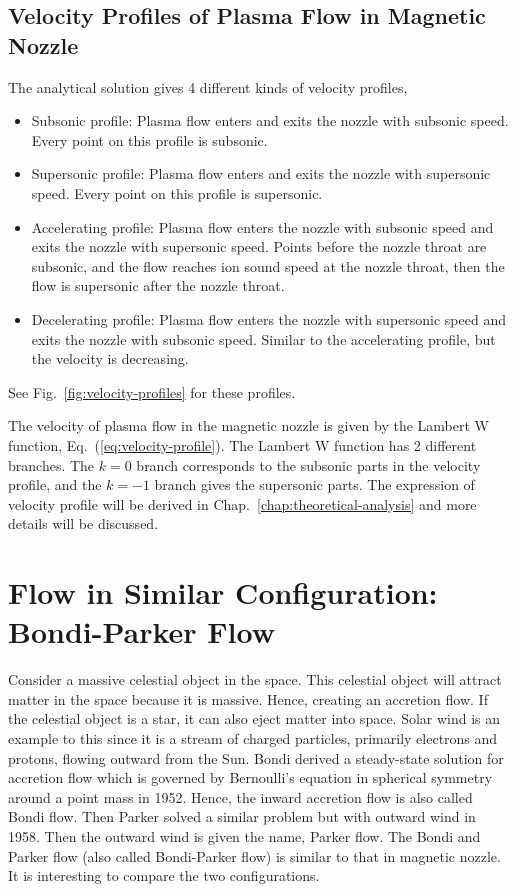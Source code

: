 \subsection{Velocity Profiles of Plasma Flow in Magnetic Nozzle}
The analytical solution gives 4 different kinds of velocity profiles,
\begin{itemize}
	\item Subsonic profile: Plasma flow enters and exits the nozzle with subsonic speed. Every point on this profile is subsonic.
	\item Supersonic profile: Plasma flow enters and exits the nozzle with supersonic speed. Every point on this profile is supersonic.
	\item Accelerating profile: Plasma flow enters the nozzle with subsonic speed and exits the nozzle with supersonic speed. Points before the nozzle throat are subsonic, and the flow reaches ion sound speed at the nozzle throat, then the flow is supersonic after the nozzle throat.
	\item Decelerating profile: Plasma flow enters the nozzle with supersonic speed and exits the nozzle with subsonic speed. Similar to the accelerating profile, but the velocity is decreasing.
\end{itemize}
See Fig.~\ref{fig:velocity-profiles} for these profiles.

The velocity of plasma flow in the magnetic nozzle is given by the Lambert W function, Eq.~(\ref{eq:velocity-profile}). The Lambert W function has 2 different branches. The $k=0$ branch corresponds to the subsonic parts in the velocity profile, and the $k=-1$ branch gives the supersonic parts. The expression of velocity profile will be derived in Chap.~\ref{chap:theoretical-analysis} and more details will be discussed.

\section{Flow in Similar Configuration: Bondi-Parker Flow}
Consider a massive celestial object in the space. This celestial object will attract matter in the space because it is massive. Hence, creating an accretion flow. If the celestial object is a star, it can also eject matter into space. Solar wind is an example to this since it is a stream of charged particles, primarily electrons and protons, flowing outward from the Sun. Bondi derived a steady-state solution for accretion flow which is governed by Bernoulli's equation in spherical symmetry around a point mass in 1952. Hence, the inward accretion flow is also called Bondi flow. Then Parker solved a similar problem but with outward wind in 1958. Then the outward wind is given the name, Parker flow. \cite{aikawa_stability_1979,bondi_spherically_1952,keto_stability_2020} The Bondi and Parker flow (also called Bondi-Parker flow) is similar to that in magnetic nozzle. It is interesting to compare the two configurations.

